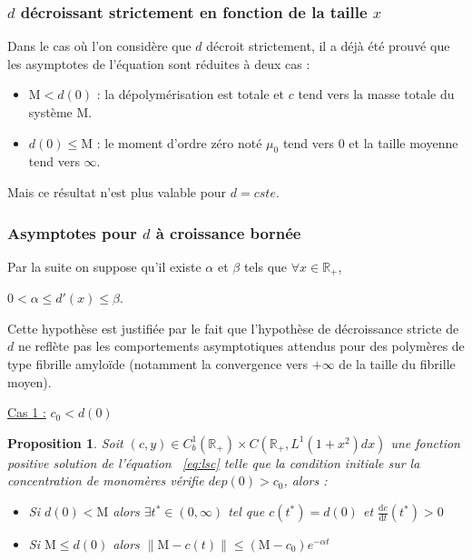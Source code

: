 \documentclass[a4paper]{article}
\newtheorem{prop}{Proposition}[section]
\theoremstyle{definition}
\theoremstyle{remark}
\newcommand{\mass}{\mathrm{M}}
\newcommand{\dep}{d}
\begin{document}
\subsubsection{$\dep$ décroissant strictement en fonction de la taille $x$}

Dans le cas où l'on considère que $\dep$ décroit strictement, il a déjà été prouvé \cite{Niethammer} que les asymptotes de l'équation sont réduites à deux cas :
\begin{itemize}
\item $\mass<\dep(0)$ :  la dépolymérisation est totale et $c$ tend vers la masse totale du système $\mass$.
\item $\dep(0) \leq \mass$ : le moment d'ordre zéro noté $\mu_0$ tend vers 0 et la taille moyenne tend vers $\infty$.
\end{itemize}

Mais ce résultat n'est plus valable pour $\dep = cste$.

\subsubsection{Asymptotes pour $\dep$ à croissance bornée}

Par la suite on suppose qu'il existe $\alpha$ et $\beta$ tels que $ \forall x \in \mathbb{R}_+$, 

$0 < \alpha \leq \dep' (x) \leq \beta$. 

Cette hypothèse est justifiée par le fait que l'hypothèse de décroissance stricte de $\dep$ ne reflète pas les comportements asymptotiques attendus pour des polymères de type fibrille amyloïde (notamment la convergence vers $+\infty$ de la taille du fibrille moyen).

\vspace{0.5cm}

\underline{Cas 1 :} $c_0<\dep(0)$

\begin{prop} 
Soit $(c,y) \in C_b^1(\mathbb{R}_+)\times C(\mathbb{R}_+,L^1(1+x^2)dx)$  une fonction positive solution de l'équation ~\eqref{eq:lsc} telle que la condition initiale sur la concentration de monomères vérifie $dep(0)>c_0$, alors :
\begin{itemize}
	\item Si $\dep(0) < \mass$ alors $\exists t^* \in (0,\infty)$ tel que $c(t^*)= \dep(0)$ et $\frac{\mathrm{d}c}{\mathrm{d}t} (t^*)>0$
	\item Si $\mass \leq \dep(0) $ alors $\|\mass - c(t)\| \leq (\mass-c_0)e^{-\alpha t}$
\end{itemize}
\end{prop}
\end{document}
